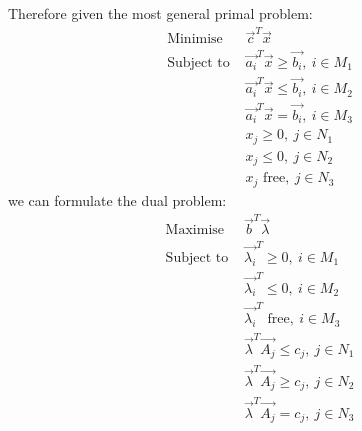 \documentclass[../Main.tex]{subfiles}
\begin{document}
Therefore given the most general primal problem:
\begin{align*}
    \text{Minimise } &\vec{c}^T\vec{x} \\
    \text{Subject to } &\vec{a_i}^T \vec{x} \geq \vec{b_i},~i \in M_1 \\
    &\vec{a_i}^T \vec{x} \leq \vec{b_i},~i \in M_2 \\
    &\vec{a_i}^T \vec{x} = \vec{b_i},~i \in M_3 \\
    &x_j \geq 0,~j \in N_1 \\
    &x_j \leq 0,~j \in N_2 \\
    &x_j \text{ free},~j \in N_3
\end{align*}
we can formulate the dual problem:
\begin{align*}
    \text{Maximise } &\vec{b}^T\vec{\lambda} \\
    \text{Subject to } &\vec{\lambda_i}^T \geq 0,~i \in M_1 \\
    &\vec{\lambda_i}^T \leq 0,~i \in M_2 \\
    &\vec{\lambda_i}^T \text{ free},~i \in M_3 \\
    &\vec{\lambda}^T \vec{A_j} \leq c_j,~j \in N_1 \\
    &\vec{\lambda}^T \vec{A_j} \geq c_j,~j \in N_2 \\
    &\vec{\lambda}^T \vec{A_j} = c_j,~j \in N_3
\end{align*}
\end{document}

